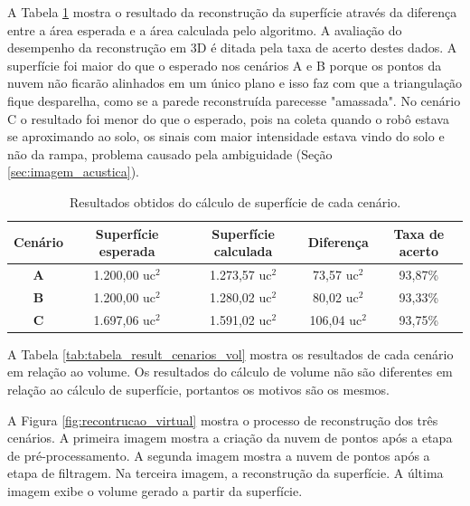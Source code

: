 A Tabela \ref{tab:tabela_result_cenarios_sup} mostra o resultado da reconstrução da superfície através da diferença entre a área esperada e a área calculada pelo algoritmo.
A avaliação do desempenho da reconstrução em 3D é ditada pela taxa de acerto destes dados.
A superfície foi maior do que o esperado nos cenários A e B porque os pontos da nuvem não ficarão alinhados em um único plano e isso faz com que a triangulação fique desparelha, como se a parede reconstruída parecesse "amassada".
No cenário C o resultado foi menor do que o esperado, pois na coleta quando o robô estava se aproximando ao solo, os sinais com maior intensidade estava vindo do solo e não da rampa, problema causado pela ambiguidade (Seção \ref{sec:imagem_acustica}).

\begin{table}[H]
    \centering
    \caption{Resultados obtidos do cálculo de superfície de cada cenário.}
    \begin{tabular}{@{}ccccc@{}}
        \toprule
        \textbf{Cenário} & \textbf{Superfície esperada} & \textbf{Superfície calculada} & \textbf{Diferença} & \textbf{Taxa de acerto} \\ \midrule
        \textbf{A} & 1.200,00 uc$^2$ & 1.273,57 uc$^2$ & 73,57 uc$^2$ & 93,87\% \\
        \textbf{B} & 1.200,00 uc$^2$ & 1.280,02 uc$^2$ & 80,02 uc$^2$ & 93,33\% \\
        \textbf{C} & 1.697,06 uc$^2$ & 1.591,02 uc$^2$ & 106,04 uc$^2$ & 93,75\% \\ \bottomrule
    \end{tabular}
    \label{tab:tabela_result_cenarios_sup}
\end{table}

A Tabela \ref{tab:tabela_result_cenarios_vol} mostra os resultados de cada cenário em relação ao volume.
Os resultados do cálculo de volume não são diferentes em relação ao cálculo de superfície, portantos os motivos são os mesmos.

A Figura \ref{fig:recontrucao_virtual} mostra o processo de reconstrução dos três cenários. 
A primeira imagem mostra a criação da nuvem de pontos após a etapa de pré-processamento.
A segunda imagem mostra a nuvem de pontos após a etapa de filtragem.
Na terceira imagem, a reconstrução da superfície.
A última imagem exibe o volume gerado a partir da superfície.

